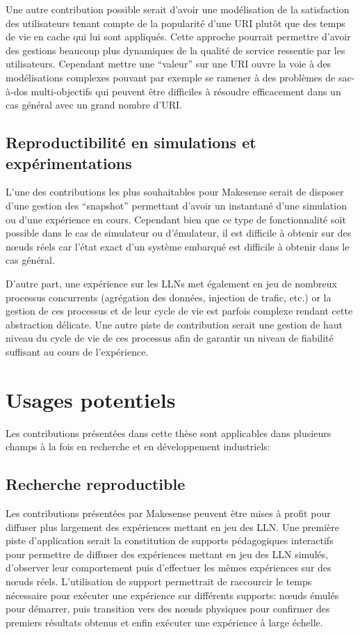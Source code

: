 Une autre contribution possible serait d'avoir une modélisation de la satisfaction des utilisateurs tenant compte de la popularité d'une \ac{URI} plutôt que des temps de vie en cache qui lui sont appliqués.
Cette approche pourrait permettre d'avoir des gestions beaucoup plus dynamiques de la qualité de service ressentie par les utilisateurs.
Cependant mettre une ``valeur'' sur une \ac{URI} ouvre la voie à des modélisations complexes pouvant par exemple se ramener à des problèmes de sac-à-dos multi-objectifs qui peuvent être difficiles à résoudre efficacement dans un cas général avec un grand nombre d'\ac{URI}.

\subsection{Reproductibilité en simulations et expérimentations}

L'une des contributions les plus souhaitables pour Makesense serait de disposer d'une gestion des ``snapshot'' permettant d'avoir un instantané d'une simulation ou d'une expérience en cours.
Cependant bien que ce type de fonctionnalité soit possible dans le cas de simulateur ou d'émulateur, il est difficile à obtenir sur des nœuds réels car l'état exact d'un système embarqué est difficile à obtenir dans le cas général.

D'autre part, une expérience sur les \ac{LLN}s met également en jeu de nombreux processus concurrents (agrégation des données, injection de trafic, etc.) or la gestion de ces processus et de leur cycle de vie est parfois complexe rendant cette abstraction délicate.
Une autre piste de contribution serait une gestion de haut niveau du cycle de vie de ces processus afin de garantir un niveau de fiabilité suffisant au cours de l'expérience.

\section{Usages potentiels}

Les contributions présentées dans cette thèse sont applicables dans plusieurs champs à la fois en recherche et en développement industriels:

\subsection{Recherche reproductible}

Les contributions présentées par Makesense peuvent être mises à profit pour diffuser plus largement des expériences mettant en jeu des \ac{LLN}.
Une première piste d'application serait la constitution de supports pédagogiques interactifs pour permettre de diffuser des expériences mettant en jeu des \ac{LLN} simulés, d'observer leur comportement puis d'effectuer les mêmes expériences sur des nœuds réels.
L'utilisation de support permettrait de raccourcir le temps nécessaire pour exécuter une expérience sur différents supports: nœuds émulés pour démarrer, puis transition vers des nœuds physiques pour confirmer des premiers résultats obtenus et enfin exécuter une expérience à large échelle.

